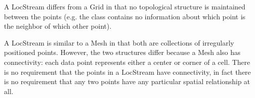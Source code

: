 
A LocStream differs from a Grid in that no topological structure is
maintained between the points
(e.g. the class contains no information about which point is the neighbor
of which other point).

A LocStream is similar to a Mesh in that both are collections of irregularly positioned 
points.  However, the two structures differ because a Mesh also has connectivity: 
each data point represents either a center or corner of a cell. There is no requirement that the
points in a LocStream have connectivity, in fact there is no requirement that any two points 
have any particular spatial relationship at all.
